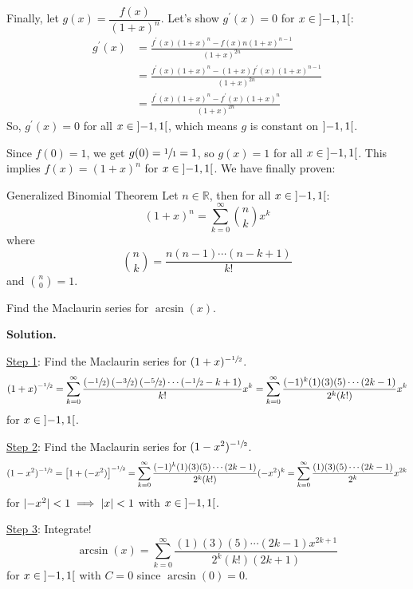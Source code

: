 Finally, let $ g(x)=\dfrac{f(x)}{(1+x)^n} $. Let's show $ g^\prime(x)=0 $
for $ x\in\interval[open]{-1}{1} $:
\begin{align*}
    g^\prime(x)
     & =\frac{f^\prime(x)(1+x)^n-f(x)n(1+x)^{n-1}}{(1+x)^{2n}}            \\
     & =\frac{f^\prime(x)(1+x)^n-(1+x)f^\prime(x)(1+x)^{n-1}}{(1+x)^{2n}} \\
     & =\frac{f^\prime(x)(1+x)^{n}-f^\prime(x)(1+x)^n}{(1+x)^{2n}}
\end{align*}
So, $ g^\prime(x)=0 $ for all $ x\in\interval[open]{-1}{1} $, which means
$ g $ is constant on $ \interval[open]{-1}{1} $.

Since $ f(0)=1 $, we get $ g(0)=\sfrac{1}{1} =1 $, so $ g(x)=1 $
for all $ x\in\interval[open]{-1}{1} $. This implies
$ f(x)=(1+x)^n $ for $ x\in\interval[open]{-1}{1} $. We have finally proven:

\begin{Theorem}{Generalized Binomial Theorem}{}
    Let $ n\in\mathbb{R} $, then for all $ x\in\interval[open]{-1}{1} $:
    \[ (1+x)^n=
        \sum\limits_{k=0}^{\infty} \binom{n}{k}x^k \]
    where
    \[ \binom{n}{k}=\frac{n(n-1)\cdots(n-k+1)}{k!} \]
    and $ \binom{n}{0}=1 $.
\end{Theorem}

\begin{Example}{}{}
    Find the Maclaurin series for $ \arcsin(x) $.

    \textbf{Solution.}

    \underline{Step 1}: Find the Maclaurin series for $ (1+x)^{-\sfrac{1}{2}} $.
    \[ (1+x)^{-\sfrac{1}{2}}
        =\sum\limits_{k=0}^{\infty} \frac{\left( -\sfrac{1}{2} \right)\left( -\sfrac{3}{2}  \right)
            \left( -\sfrac{5}{2} \right)\cdots\left( -\sfrac{1}{2} -k +1\right)}{k!}x^k
        =\sum\limits_{k=0}^{\infty} \frac{(-1)^k(1)(3)(5)\cdots(2k-1)}{2^k (k!)}x^k   \]
    for $ x\in\interval[open]{-1}{1} $.

    \underline{Step 2}: Find the Maclaurin series for $ (1-x^2)^{-\sfrac{1}{2} } $.
    \[ (1-x^2)^{-\sfrac{1}{2}}
        =\left[ 1+(-x^2) \right]^{-\sfrac{1}{2}}
        =\sum\limits_{k=0}^{\infty} \frac{(-1)^k(1)(3)(5)\cdots(2k-1)}{2^k (k!)}(-x^2)^k
        =\sum\limits_{k=0}^{\infty} \frac{(1)(3)(5)\cdots(2k-1)}{2^k}x^{2k}  \]
    for $ \lvert-x^2\rvert<1\implies\lvert x\rvert<1 $ with $ x\in\interval[open]{-1}{1} $.

    \underline{Step 3}: Integrate!
    \[ \arcsin(x)
        =\sum\limits_{k=0}^{\infty}\frac{(1)(3)(5)\cdots(2k-1)x^{2k+1}}{2^k(k!)(2k+1)}   \]
    for $ x\in\interval[open]{-1}{1} $ with $ C=0 $ since $ \arcsin(0)=0 $.
\end{Example}

